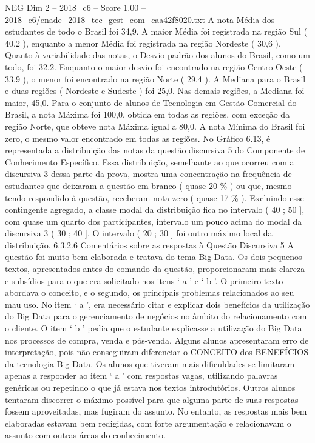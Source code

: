 \begin{textsample}{NEG Dim 2 – 2018\_c6 – Score 1.00 – 2018\_c6/enade\_2018\_tec\_gest\_com\_caa42f8020.txt}
A nota Média dos estudantes de todo o Brasil foi 34,9.
A maior Média foi registrada na região Sul ( 40,2 ), enquanto a menor Média foi registrada na região Nordeste ( 30,6 ).
Quanto à variabilidade das notas, o Desvio padrão dos alunos do Brasil, como um todo, foi 32,2.
Enquanto o maior desvio foi encontrado na região Centro-Oeste ( 33,9 ), o menor foi encontrado na região Norte ( 29,4 ).
A Mediana para o Brasil e duas regiões ( Nordeste e Sudeste ) foi 25,0.
Nas demais regiões, a Mediana foi maior, 45,0.
Para o conjunto de alunos de Tecnologia em Gestão Comercial do Brasil, a nota Máxima foi 100,0, obtida em todas as regiões, com exceção da região Norte, que obteve nota Máxima igual a 80,0.
A nota Mínima do Brasil foi zero, o mesmo valor encontrado em todas as regiões.
No Gráfico 6.13, é representada a distribuição das notas da questão discursiva 5 do Componente de Conhecimento Específico.
Essa distribuição, semelhante ao que ocorreu com a discursiva 3 dessa parte da prova, mostra uma concentração na frequência de estudantes que deixaram a questão em branco ( quase 20 \% ) ou que, mesmo tendo respondido à questão, receberam nota zero ( quase 17 \% ).
Excluindo esse contingente agregado, a classe modal da distribuição fica no intervalo ( 40 ; 50 ], com quase um quarto dos participantes, intervalo um pouco acima do modal da discursiva 3 ( 30 ; 40 ].
O intervalo ( 20 ; 30 ] foi outro máximo local da distribuição. 6.3.2.6 Comentários sobre as respostas à Questão Discursiva 5 A questão foi muito bem elaborada e tratava do tema Big Data.
Os dois pequenos textos, apresentados antes do comando da questão, proporcionaram mais clareza e subsídios para o que era solicitado nos itens ‘ a ’ e ‘ b ’.
O primeiro texto abordava o conceito, e o segundo, os principais problemas relacionados ao seu mau uso.
No item ‘ a ’, era necessário citar e explicar dois benefícios da utilização do Big Data para o gerenciamento de negócios no âmbito do relacionamento com o cliente.
O item ‘ b ’ pedia que o estudante explicasse a utilização do Big Data nos processos de compra, venda e pós-venda.
Alguns alunos apresentaram erro de interpretação, pois não conseguiram diferenciar o CONCEITO dos BENEFÍCIOS da tecnologia Big Data.
Os alunos que tiveram mais dificuldades se limitaram apenas a responder ao item ‘ a ’ com respostas vagas, utilizando palavras genéricas ou repetindo o que já estava nos textos introdutórios.
Outros alunos tentaram discorrer o máximo possível para que alguma parte de suas respostas fossem aproveitadas, mas fugiram do assunto.
No entanto, as respostas mais bem elaboradas estavam bem redigidas, com forte argumentação e relacionavam o assunto com outras áreas do conhecimento.

\end{textsample}
